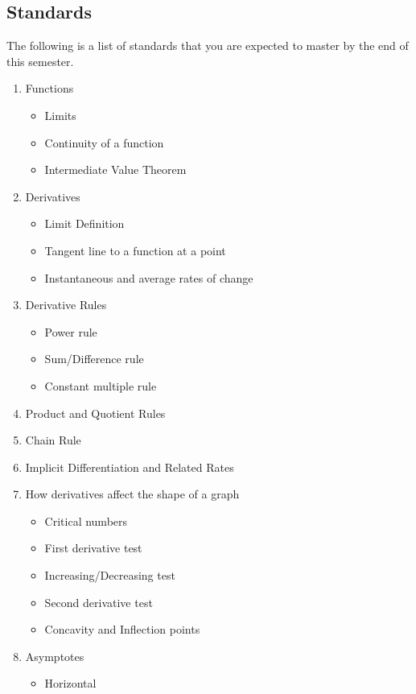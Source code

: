 \documentclass[12pt]{amsart}
\begin{document}
\subsection*{Standards}
The following is a list of standards that you are expected to master by the end of this semester.
\begin{multicols}{2}
  \begin{enumerate}[1.]
\item
  Functions
  \begin{itemize}
  \item
    Limits
  \item
    Continuity of a function
  \item
    Intermediate Value Theorem
  \end{itemize}
\item
  Derivatives
  \begin{itemize}
  \item
    Limit Definition
  \item
    Tangent line to a function at a point
  \item
    Instantaneous and average rates of change
  \end{itemize}
\item
  Derivative Rules
  \begin{itemize}
  \item
    Power rule
  \item
    Sum/Difference rule
  \item
    Constant multiple rule
  \end{itemize}
\item
  Product and Quotient Rules
\item
  Chain Rule
\item
  Implicit Differentiation and Related Rates
\item
  How derivatives affect the shape of a graph
  \begin{itemize}
  \item
    Critical numbers
  \item
    First derivative test
  \item
    Increasing/Decreasing test
  \item
    Second derivative test
  \item
    Concavity and Inflection points
  \end{itemize}
\item
  Asymptotes
  \begin{itemize}
  \item
    Horizontal

\end{itemize}
\end{enumerate}
\end{multicols}
\end{document}
